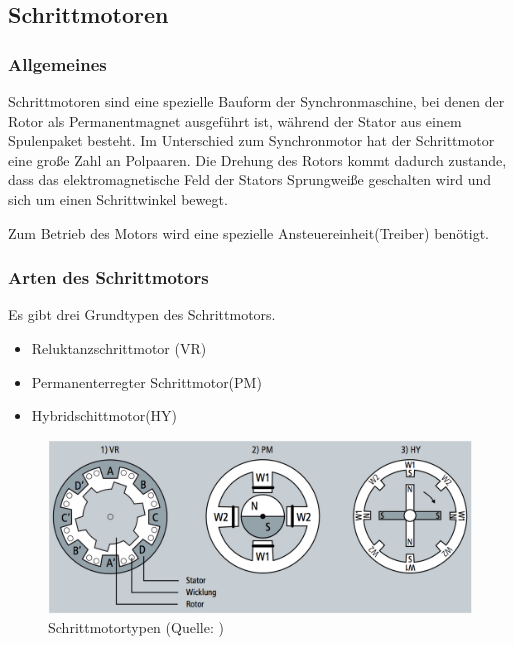 \renewcommand{\autoren}{Severin Schendel	}
\newpage

\subsection{Schrittmotoren}
\subsubsection{Allgemeines}
Schrittmotoren sind eine spezielle Bauform der Synchronmaschine, bei denen der Rotor als Permanentmagnet ausgeführt ist, während der Stator aus einem Spulenpaket besteht. Im Unterschied zum Synchronmotor hat der Schrittmotor eine große Zahl an Polpaaren. Die Drehung des Rotors kommt dadurch zustande, dass das elektromagnetische Feld der Stators Sprungweiße geschalten wird und sich um einen Schrittwinkel bewegt.

Zum Betrieb des Motors wird eine spezielle Ansteuereinheit(Treiber) benötigt.

\subsubsection{Arten des Schrittmotors}

Es gibt drei Grundtypen des Schrittmotors.

\begin{itemize}
	\item Reluktanzschrittmotor (VR)
	\item Permanenterregter Schrittmotor(PM)
	\item Hybridschittmotor(HY)
\end{itemize}

\begin{figure}[h]  %
\centering\includegraphics[width=1.0\textwidth]{images/Schrittmotortypen.png}
\caption{Schrittmotortypen \newline (Quelle: \cite{roboterKS_Bild})}
\label{robotKSys}
\end{figure}

